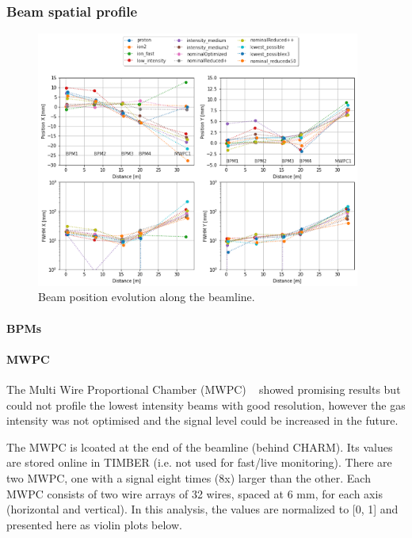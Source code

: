 \subsubsection{Beam spatial profile}


\begin{figure}[H]
    \centering
    \includegraphics[width=0.95\textwidth]{images/mwpc/beam_position_evolution_MWPC.png}
    \caption{Beam position evolution along the beamline.}
    \label{fig:my_label}
\end{figure}


    \paragraph{BPMs}
    
    \paragraph{MWPC}

    The Multi Wire Proportional Chamber (MWPC) ~\cite{MWPC:CHARPAK1968262} showed promising results but could not profile the lowest intensity beams with good resolution, however the gas intensity was not optimised and the signal level could be increased in the future. 
    
    The MWPC is lcoated at the end of the beamline (behind CHARM). Its values are stored online in TIMBER (i.e. not used for fast/live monitoring). There are two MWPC, one with a signal eight times (8x) larger than the other. Each MWPC consists of two wire arrays of 32 wires, spaced at 6 mm, for each axis (horizontal and vertical). In this analysis, the values are normalized to [0, 1] and presented here as violin plots below.




